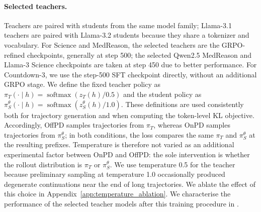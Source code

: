 \documentclass{article} %
\theoremstyle{plain}
\theoremstyle{definition}
\theoremstyle{remark}
\begin{document}
\paragraph{Selected teachers.} Teachers are paired with students from the same model family; Llama-3.1 teachers are paired with Llama-3.2 students because they share a tokenizer and vocabulary. For Science and MedReason, the selected teachers are the GRPO-refined checkpoints, generally at step 500; the selected Qwen2.5 MedReason and Llama-3 Science checkpoints are taken at step 450 due to better performance. For Countdown-3, we use the step-500 SFT checkpoint directly, without an additional GRPO stage. We define the fixed teacher policy as \(\pi_T(\cdot\mid h)=\operatorname{softmax}(z_T(h)/0.5)\) and the student policy as \(\pi_S^\theta(\cdot\mid h)=\operatorname{softmax}(z_S^\theta(h)/1.0)\). These definitions are used consistently both for trajectory generation and when computing the token-level KL objective. Accordingly, OffPD samples trajectories from \(\pi_T\), whereas OnPD samples trajectories from \(\pi_S^\theta\); in both conditions, the loss compares the same \(\pi_T\) and \(\pi_S^\theta\) at the resulting prefixes. Temperature is therefore not varied as an additional experimental factor between OnPD and OffPD: the sole intervention is whether the rollout distribution is \(\pi_T\) or \(\pi_S^\theta\). We use temperature 0.5 for the teacher because preliminary sampling at temperature 1.0 occasionally produced degenerate continuations near the end of long trajectories. We ablate the effect of this choice in Appendix~\ref{app:temperature_ablation}. We characterise the performance of the selected teacher models after this training procedure in .
\end{document}
